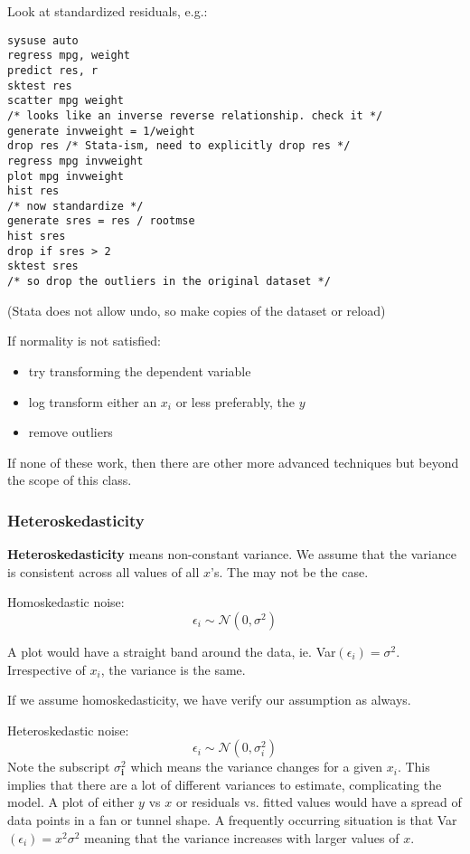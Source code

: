 \documentclass[11pt, oneside]{article}   	%
\begin{document}
Look at standardized residuals, e.g.:
\begin{verbatim}
sysuse auto
regress mpg, weight
predict res, r
sktest res
scatter mpg weight
/* looks like an inverse reverse relationship. check it */
generate invweight = 1/weight
drop res /* Stata-ism, need to explicitly drop res */
regress mpg invweight
plot mpg invweight
hist res
/* now standardize */
generate sres = res / rootmse
hist sres
drop if sres > 2
sktest sres
/* so drop the outliers in the original dataset */
\end{verbatim}

(Stata does not allow undo, so make copies of the dataset or reload)

If normality is not satisfied:
\begin{itemize}
\item{try transforming the dependent variable}
\item{log transform either an $x_i$ or less preferably, the $y$}
\item{remove outliers}
\end{itemize}

If none of these work, then there are other more advanced techniques but beyond the scope of this class.

\subsubsection{Heteroskedasticity}

\textbf{Heteroskedasticity} means non-constant variance. We assume that the variance is consistent across all values of all $x$'s. The may not be the case.

Homoskedastic noise:
\[
\epsilon_i \sim \mathcal{N}(0,\sigma^2)
\]

A plot would have a straight band around the data, ie. Var$(\epsilon_i) = \sigma^2$. Irrespective of $x_i$, the variance is the same.

If we assume homoskedasticity, we have verify our assumption as always.

Heteroskedastic noise:
\[
\epsilon_i \sim \mathcal{N}(0,\sigma^2_i)
\]
Note the subscript $\sigma^2_\textbf{i}$ which means the variance changes for a given $x_i$. This implies that there are a lot of different variances to estimate, complicating the model. A plot of either $y$ vs $x$ or residuals vs. fitted values would have a spread of data points in a fan or tunnel shape. A frequently occurring situation is that Var$(\epsilon_i) = x^2\sigma^2$ meaning that the variance increases with larger values of $x$.
\end{document}
